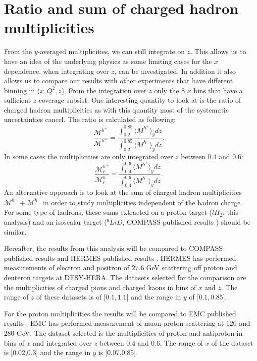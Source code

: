 \section{Ratio and sum of charged hadron multiplicities}

From the $y$-averaged multiplicities, we can still integrate on $z$. This allows us to have an idea of the underlying physics as some limiting cases for the $x$ dependence, when integrating over $z$, can be investigated. In addition it also allows us to compare our results with other experiments that have different binning in ($x,Q^2,z$). From the integration over $z$ only the 8 $x$ bins that have a sufficient $z$ coverage subsist. One interesting quantity to look at is the ratio of charged hadron multiplicities as with this quantity most of the systematic uncertainties cancel. The ratio is calculated as following:
%
\begin{equation}
  \frac{\mathscr{M}^{h^+}}{\mathscr{M}^{h^-}} = \frac{\int_{0.2}^{0.85} \langle M^{h^+} \rangle_y dz}{\int_{0.2}^{0.85} \langle M^{h^-} \rangle_y dz}.
\end{equation}
%
In some cases the multiplicities are only integrated over $z$ between $0.4$ and $0.6$:
%
\begin{equation}
  \frac{\mathscr{M}^{h^+}_{r}}{\mathscr{M}^{h^-}_{r}} = \frac{\int_{0.4}^{0.6} \langle M^{h^+} \rangle_y dz}{\int_{0.4}^{0.6} \langle M^{h^-} \rangle_y dz}.
\end{equation}
%
An alternative approach is to look at the sum of charged hadron multiplicities $\mathscr{M}^{h^+}+\mathscr{M}^{h^-}$ in order to study multiplicities independent of the hadron charge. For some type of hadrons, these sums extracted on a proton target ($lH_2$, this analysis) and an isoscalar target ($^6LiD$, COMPASS published results \cite{COMPASS2006Pi,COMPASS2006K}) should be similar.

Hereafter, the results from this analysis will be compared to COMPASS published results and HERMES published results \cite{HERMESMult}. HERMES has performed measurements of electron and positron of $27.6$ GeV scattering off proton and deuteron targets at DESY-HERA. The datasets selected for the comparison are the multiplicities of charged pions and charged kaons in bins of $x$ and $z$. The range of $z$ of these datasets is of [$0.1,1.1$] and the range in $y$ of [$0.1,0.85$].

For the proton multiplicities the results will be compared to EMC published results \cite{EMCMult}. EMC has performed measurement of muon-proton scattering at $120$ and $280$ GeV. The dataset selected is the multiplicities of proton and antiproton in bins of $x$ and integrated over $z$ between $0.4$ and $0.6$. The range of $x$ of the dataset is [$0.02$,$0.3$] and the range in $y$ is [$0.07$,$0.85$].


